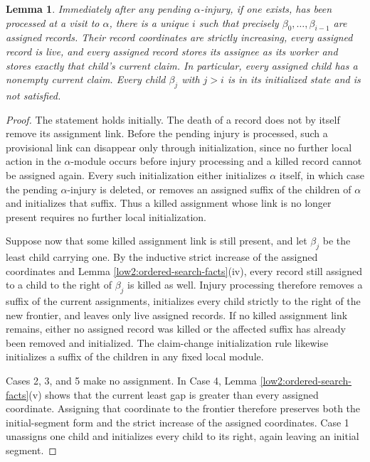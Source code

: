 \documentclass[10pt,a4paper]{amsart}
\newtheorem{lemma}[theorem]{Lemma}
\begin{document}
\begin{lemma}\label{low2:frontier}
Immediately after any pending $\alpha$-injury, if one exists, has been
processed at a visit to $\alpha$, there is a unique $i$ such that precisely
$\beta_0,\ldots,\beta_{i-1}$ are assigned records. Their record coordinates
are strictly increasing, every assigned record is live, and every assigned
record stores its assignee as its worker and stores exactly that child's
current claim. In particular, every assigned child has a nonempty current
claim. Every child $\beta_j$ with $j>i$ is in its initialized state and is not
satisfied.
\end{lemma}

\begin{proof}
The statement holds initially. The death of a record does not by itself remove
its assignment link. Before the pending injury is processed, such a
provisional link can disappear only through initialization, since no further
local action in the $\alpha$-module occurs before injury processing and a
killed record cannot be assigned again. Every such initialization either
initializes $\alpha$ itself, in which case the pending $\alpha$-injury is
deleted, or removes an assigned suffix of the children of $\alpha$ and
initializes that suffix. Thus a killed assignment whose link is no longer
present requires no further local initialization.

Suppose now that some killed assignment link is still present, and let
$\beta_j$ be the least child carrying one. By the inductive strict increase of
the assigned coordinates and Lemma
\ref{low2:ordered-search-facts}(iv), every record still assigned to a child to
the right of $\beta_j$ is killed as well. Injury processing therefore removes
a suffix of the current assignments, initializes every child strictly to the
right of the new frontier, and leaves only live assigned records. If no killed
assignment link remains, either no assigned record was killed or the affected
suffix has already been removed and initialized. The claim-change
initialization rule likewise initializes a suffix of the children in any fixed
local module.

Cases 2, 3, and 5 make no assignment. In Case 4, Lemma
\ref{low2:ordered-search-facts}(v) shows that the current least gap is greater
than every assigned coordinate. Assigning that coordinate to the frontier
therefore preserves both the initial-segment form and the strict increase of
the assigned coordinates. Case 1 unassigns one child and initializes every
child to its right, again leaving an initial segment.


\end{proof}
\end{document}
